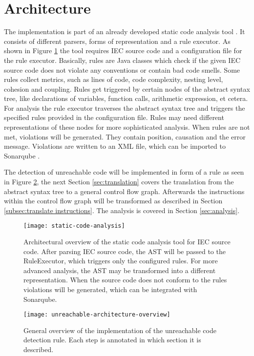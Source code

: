 \section{Architecture}
The implementation is part of an already developed static code analysis tool \cite{Prahofer_2012}. 
It consists of different parsers, forms of representation and a rule executor. 
As shown in Figure \ref{fig:general architecture} the tool requires IEC source code and a configuration file for the rule executor.
Basically, rules are Java classes which check if the given IEC source code does not violate any conventions or contain bad code smells. 
Some rules collect metrics, such as lines of code, code complexity, nesting level, cohesion and coupling.
Rules get triggered by certain nodes of the abstract syntax tree, like declarations of variables, function calls, arithmetic expression, et cetera.
For analysis the rule executor traverses the abstract syntax tree and triggers the specified rules provided in the configuration file.
Rules may need different representations of these nodes for more sophisticated analysis. 
When rules are not met, violations will be generated. They contain position, causation and the error message. Violations are written to an XML file, which can be imported to Sonarqube \cite{sonarqube}.


The detection of unreachable code will be implemented in form of a rule as seen in Figure \ref{fig:unreachable-architecture-overview}, the next Section \ref{sec:translation} covers the translation from the abstract syntax tree to a general control flow graph. 
Afterwards the instructions within the control flow graph will be transformed as described in Section \ref{subsec:translate instructions}.
The analysis is covered in Section \ref{sec:analysis}.
\begin{figure}[h!]
	\centering
	\texttt{[image: static-code-analysis]}
	\caption{Architectural overview of the static code analysis tool for IEC source code. After parsing IEC source code, the AST will be passed to the RuleExecutor, which triggers only the configured rules. For more advanced analysis, the AST may be transformed into a different representation. When the source code does not conform to the rules violations will be generated, which can be integrated with Sonarqube.}
	\label{fig:general architecture}
\end{figure}

\begin{figure}[h!]
	\centering
	\texttt{[image: unreachable-architecture-overview]}
	\caption{General overview of the implementation of the unreachable code detection rule. Each step is annotated in which section it is described. }
	\label{fig:unreachable-architecture-overview}
\end{figure}

